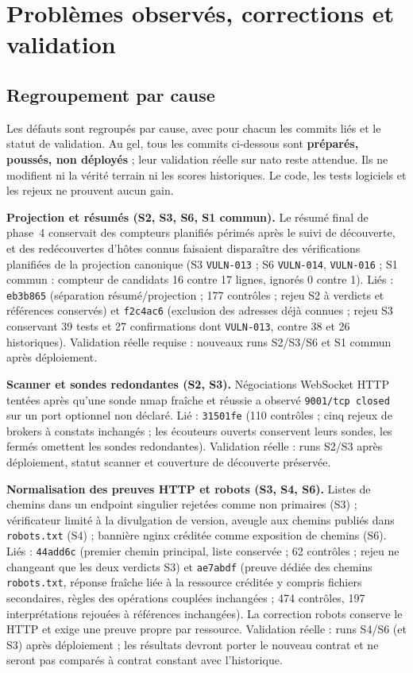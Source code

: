 \documentclass[11pt,a4paper]{article}
\newcommand{\code}[1]{{\urlstyle{tt}\nolinkurl{#1}}}
\begin{document}
\section{Probl\`emes observ\'es, corrections et validation}
\label{sec:corrections}
\subsection{Regroupement par cause}
Les d\'efauts sont regroup\'es par cause, avec pour chacun les commits li\'es et le statut de validation. Au gel, tous les commits ci-dessous sont \textbf{préparés, poussés, non déployés} ; leur validation r\'eelle sur nato reste attendue. Ils ne modifient ni la v\'erit\'e terrain ni les scores historiques. Le code, les tests logiciels et les rejeux ne prouvent aucun gain.

\textbf{Projection et r\'esum\'es (S2, S3, S6, S1 commun).} Le r\'esum\'e final de phase~4 conservait des compteurs planifi\'es p\'erim\'es apr\`es le suivi de d\'ecouverte, et des red\'ecouvertes d'h\^otes connus faisaient dispara\^itre des v\'erifications planifi\'ees de la projection canonique (S3 \code{VULN-013} ; S6 \code{VULN-014}, \code{VULN-016} ; S1 commun : compteur de candidats 16 contre 17 lignes, ignorés 0 contre 1). Li\'es : \code{eb3b865} (s\'eparation r\'esum\'e/projection ; 177 contr\^oles ; rejeu S2 \`a verdicts et r\'ef\'erences conserv\'es) et \code{f2c4ac6} (exclusion des adresses d\'ej\`a connues ; rejeu S3 conservant 39 tests et 27 confirmations dont \code{VULN-013}, contre 38 et 26 historiques). Validation r\'eelle requise : nouveaux runs S2/S3/S6 et S1 commun apr\`es d\'eploiement.

\textbf{Scanner et sondes redondantes (S2, S3).} N\'egociations WebSocket HTTP tent\'ees apr\`es qu'une sonde nmap fra\^iche et r\'eussie a observ\'e \code{9001/tcp closed} sur un port optionnel non d\'eclar\'e. Li\'e : \code{31501fe} (110 contr\^oles ; cinq rejeux de brokers \`a constats inchang\'es ; les \'ecouteurs ouverts conservent leurs sondes, les ferm\'es omettent les sondes redondantes). Validation r\'eelle : runs S2/S3 apr\`es d\'eploiement, statut scanner et couverture de d\'ecouverte pr\'eserv\'ee.

\textbf{Normalisation des preuves HTTP et robots (S3, S4, S6).} Listes de chemins dans un endpoint singulier rejet\'ees comme non primaires (S3) ; v\'erificateur limit\'e \`a la divulgation de version, aveugle aux chemins publi\'es dans \code{robots.txt} (S4) ; banni\`ere nginx cr\'edit\'ee comme exposition de chemins (S6). Li\'es : \code{44add6c} (premier chemin principal, liste conserv\'ee ; 62 contr\^oles ; rejeu ne changeant que les deux verdicts S3) et \code{ae7abdf} (preuve d\'edi\'ee des chemins \code{robots.txt}, r\'eponse fra\^iche li\'ee \`a la ressource cr\'edit\'ee y compris fichiers secondaires, r\`egles des op\'erations coupl\'ees inchang\'ees ; 474 contr\^oles, 197 interpr\'etations rejou\'ees \`a r\'ef\'erences inchang\'ees). La correction robots conserve le HTTP et exige une preuve propre par ressource. Validation r\'eelle : runs S4/S6 (et S3) apr\`es d\'eploiement ; les r\'esultats devront porter le nouveau contrat et ne seront pas compar\'es \`a contrat constant avec l'historique.
\end{document}
